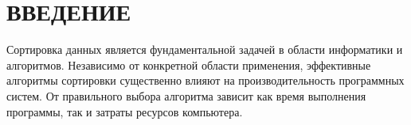 \chapter*{ВВЕДЕНИЕ}

Сортировка данных является фундаментальной задачей в области информатики и алгоритмов. 
Независимо от конкретной области применения, эффективные алгоритмы сортировки существенно влияют на производительность программных систем. 
От правильного выбора алгоритма зависит как время выполнения программы, так и затраты ресурсов компьютера.


